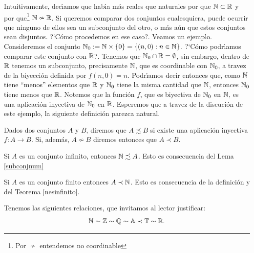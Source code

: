 Intuitivamente, dec\'{\i}amos que hab\'{\i}a m\'as reales que
naturales por que $\nn\subset\rr$ y por que\footnote{Por $\nsim$
entendemos no coordinable} $\nn\nsim\rr$. Si queremos comparar dos
conjuntos cualesquiera, puede ocurrir que ninguno de ellos sea un
subconjunto del otro, o m\'as a\'un que estos conjuntos sean
disjuntos. ?`C\'omo procedemos en ese caso?. Veamos un ejemplo.
Consideremos el conjunto $\nn_0:=\nn\times
\{0\}=\{(n,0):n\in\nn\}$. ?`C\'omo podr\'{\i}amos comparar este
conjunto con $\rr$?. Tenemos que $\nn_0\cap\rr=\emptyset$, sin
embargo, dentro de $\rr$ tenemos un subconjunto, precisamente
$\nn$, que es coordinable con $\nn_0$, a travez de la biyecci\'on
definida por $f(n,0)=n$. Podr\'{\i}amos decir entonces que, como
$\nn$ tiene ``menos'' elementos que $\rr$ y $\nn_0$ tiene la misma
cantidad que $\nn$, entonces $\nn_0$ tiene menos que $\rr$.
Notemos que la funci\'on $f$, que es biyectiva de $\nn_0$ en
$\nn$, es una aplicaci\'on inyectiva de $\nn_0$ en $\rr$.
Esperemos que a travez de la discuci\'on de este ejemplo, la
siguiente definici\'on parezca natural.

\begin{definicion}\label{relorden} Dados dos conjuntos $A$ y $B$, diremos que
$A\precsim B$ si existe una aplicaci\'on inyectiva
$f:A\longrightarrow B$. Si, adem\'as, $A\nsim B$ diremos entonces
que $A\prec B$.
\end{definicion}


\begin{ejemplo} Si $A$ es un conjunto infinito, entonces
$\nn\precsim A $. Esto es consecuencia del Lema \vref{subconjnum}
\end{ejemplo}

\begin{ejemplo} Si $A$ es un conjunto finito entonces $A\prec\nn$.
Esto es consecuencia de la definici\'on y del Teorema
\vref{nesinfinito}.
\end{ejemplo}

\begin{ejemplo} Tenemos las siguientes relaciones, que invitamos
al lector  justificar:
\[\nn\thicksim\mathbb{Z}\thicksim\mathbb{Q}\thicksim\mathbb{A}\prec\mathbb{T}\thicksim\rr.\]
\end{ejemplo}

